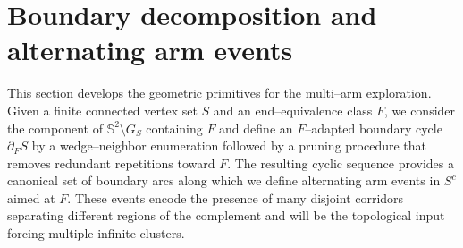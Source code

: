 \documentclass[11pt]{amsart}
\theoremstyle{plain}
\numberwithin{equation}{section}
\numberwithin{figure}{section}
\begin{document}
\section{Boundary decomposition and alternating arm events}
\label{sec4}

This section develops the geometric primitives for the multi--arm exploration.
Given a finite connected vertex set $S$ and an end--equivalence class $F$, we consider the component
of $\mathbb S^2\setminus G_S$ containing $F$ and define an $F$--adapted boundary cycle
$\partial_F S$ by a wedge--neighbor enumeration followed by a pruning procedure that removes
redundant repetitions toward $F$.
The resulting cyclic sequence provides a canonical set of boundary arcs along which we define
alternating arm events in $S^c$ aimed at $F$.  These events encode the presence of many disjoint
corridors separating different regions of the complement and will be the topological input forcing
multiple infinite clusters.
\end{document}
